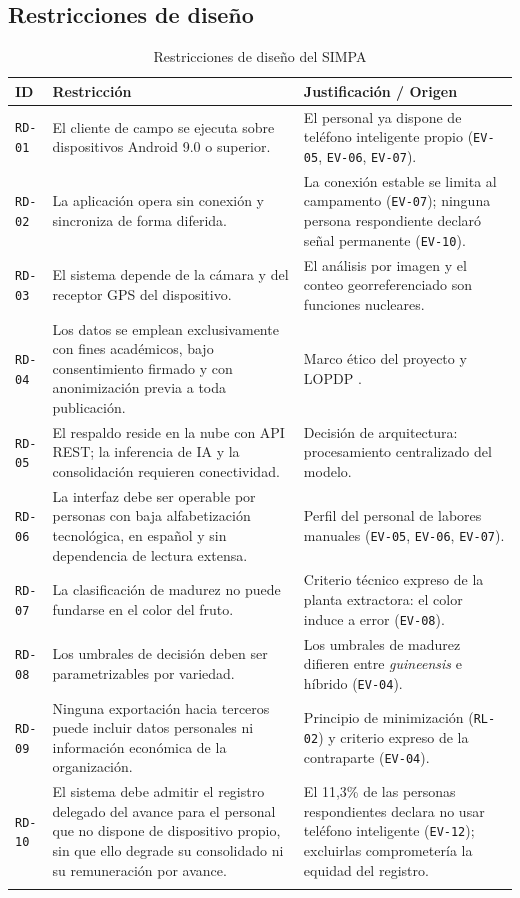 \documentclass[11pt,a4paper]{article}
\newcommand{\id}[1]{\texttt{\begingroup\hyphenpenalty=10000\relax#1\endgroup}}
\renewcommand{\id}[1]{\texttt{#1}}
\begin{document}
\subsection{Restricciones de diseño}

\begin{longtable}{|C{1.5cm}|L{6.8cm}|L{6.6cm}|}
\hline
{}\textbf{ID} & \textbf{Restricción} & \textbf{Justificación / Origen} \\
\hline
\endhead
\id{RD-01} & El cliente de campo se ejecuta sobre dispositivos Android 9.0 o superior. & El personal ya dispone de teléfono inteligente propio (\id{EV-05}, \id{EV-06}, \id{EV-07}). \\ \hline
\id{RD-02} & La aplicación opera sin conexión y sincroniza de forma diferida. & La conexión estable se limita al campamento (\id{EV-07}); ninguna persona respondiente declaró señal permanente (\id{EV-10}). \\ \hline
\id{RD-03} & El sistema depende de la cámara y del receptor GPS del dispositivo. & El análisis por imagen y el conteo georreferenciado son funciones nucleares. \\ \hline
\id{RD-04} & Los datos se emplean exclusivamente con fines académicos, bajo consentimiento firmado y con anonimización previa a toda publicación. & Marco ético del proyecto y LOPDP \cite{lopdp}. \\ \hline
\id{RD-05} & El respaldo reside en la nube con API REST; la inferencia de IA y la consolidación requieren conectividad. & Decisión de arquitectura: procesamiento centralizado del modelo. \\ \hline
\id{RD-06} & La interfaz debe ser operable por personas con baja alfabetización tecnológica, en español y sin dependencia de lectura extensa. & Perfil del personal de labores manuales (\id{EV-05}, \id{EV-06}, \id{EV-07}). \\ \hline
\id{RD-07} & La clasificación de madurez no puede fundarse en el color del fruto. & Criterio técnico expreso de la planta extractora: el color induce a error (\id{EV-08}). \\ \hline
\id{RD-08} & Los umbrales de decisión deben ser parametrizables por variedad. & Los umbrales de madurez difieren entre \emph{guineensis} e híbrido (\id{EV-04}). \\ \hline
\id{RD-09} & Ninguna exportación hacia terceros puede incluir datos personales ni información económica de la organización. & Principio de minimización (\id{RL-02}) y criterio expreso de la contraparte (\id{EV-04}). \\ \hline
\id{RD-10} & El sistema debe admitir el registro delegado del avance para el personal que no dispone de dispositivo propio, sin que ello degrade su consolidado ni su remuneración por avance. & El 11{,}3\% de las personas respondientes declara no usar teléfono inteligente (\id{EV-12}); excluirlas comprometería la equidad del registro. \\ \hline
\caption{Restricciones de diseño del SIMPA}
\end{longtable}
\end{document}
